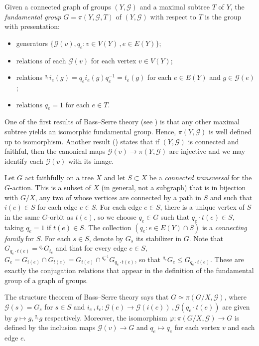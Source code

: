 \documentclass[a4paper]{amsart}
\theoremstyle{definition}
\theoremstyle{remark}
\newcommand{\G}{\mathcal G}
\begin{document}
Given a connected graph of groups \((Y,\G)\) and a maximal subtree \(T\) of \(Y\), the \emph{fundamental group} \(G = \pi(Y,\G,T)\) of \((Y,\G)\) with respect to \(T\) is the group with presentation:
\begin{itemize}
    \item generators \(\{\G(v), q_e\colon v \in V(Y)\,, e \in E(Y)\}\);
    \item relations of each \(\G(v)\) for each vertex \(v \in V(Y)\);
    \item relations \({^{q_e}i_e(g)} =q_ei_e(g)q_e^{-1} = t_e(g)\) for each \(e \in E(Y)\) and \(g \in \G(e)\);
    \item relations \(q_e = 1\) for each \(e \in T\).
\end{itemize}

One of the first results of Bass--Serre theory (see \cite[Sec. I.7]{dicksGroupsActingGraphs1989}) is that any other maximal subtree yields an isomorphic fundamental group. Hence, \(\pi(Y,\G)\) is well defined up to isomorphism. Another result (\cite[Cor. I.7.5]{dicksGroupsActingGraphs1989}) states that if \((Y,\G)\) is connected and faithful, then the canonical maps \(\G(v) \to \pi(Y,\G)\) are injective and we may identify each \(\G(v)\) with its image.

Let \(G\) act faithfully on a tree \(X\) and let \(S \subset X\) be a \emph{connected transversal} for the \(G\)-action. This is a subset of \(X\) (in general, not a subgraph) that is in bijection with \(G / X\), any two of whose vertices are connected by a path in \(S\) and such that \(i(e) \in S\) for each edge \(e \in S\). For each edge \(e \in S\), there is a unique vertex of \(S\) in the same \(G\)-orbit as \(t(e)\), so we choose \(q_e \in G\) such that \(q_e\cdot t(e) \in S\), taking \(q_e = 1\) if \(t(e) \in S\). The collection \((q_e\colon e \in E(Y) \cap S)\) is a \emph{connecting family} for \(S\). For each \(s \in S\), denote by \(G_s\) its stabilizer in \(G\). Note that \(G_{q_e\cdot t(e)} = {^{q_e} G_{t_e}}\) and that for every edge \(e \in S\), \(G_e = G_{i(e)} \cap G_{t(e)} = G_{i(e)} \cap {^{q_e^{-1}}G_{q_e\cdot t(e)}}\), so that \({^{q_e}G_e} \leq G_{q_e\cdot t(e)}\). These are exactly the conjugation relations that appear in the definition of the fundamental group of a graph of groups.

The structure theorem of Bass--Serre theory says that \(G \simeq \pi(G/ X, \G)\), where \(\G(s) = G_s\) for \(s \in S\) and \(i_e\,, t_e\colon \G(e) \to \G(i(e))\,, \G(q_e\cdot t(e))\) are given by \(g \mapsto g, {^{q_e}g}\) respectively. Moreover, the isomorphism \(\varphi\colon \pi(G/ X, \G) \to G\) is defined by the inclusion maps \(\G(v) \to G\) and \(q_e \mapsto q_e\) for each vertex \(v\) and each edge \(e\).
\end{document}
